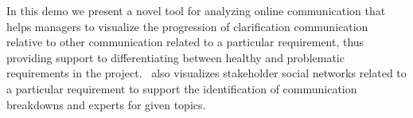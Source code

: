 
In this demo we present a novel tool for analyzing online communication that helps managers to visualize the progression of clarification communication relative to other communication related to a particular requirement, thus providing support to differentiating between healthy and problematic requirements in the project. 
\viss\ also visualizes stakeholder social networks related to a particular requirement to support the identification of communication breakdowns and experts for given topics.



